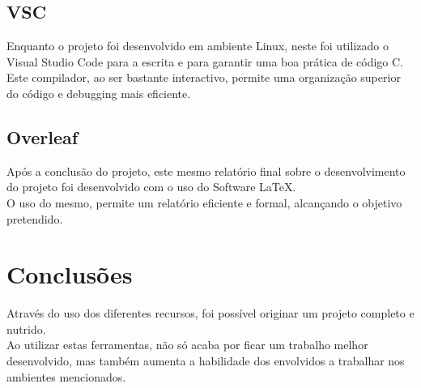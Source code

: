 \subsection{VSC}
\label{chap3:rec:vsc}
Enquanto o projeto foi desenvolvido em ambiente Linux, neste foi utilizado o Visual Studio Code para a escrita e para garantir uma boa prática de código C. Este compilador, ao ser bastante interactivo, permite uma organização superior do código e debugging mais eficiente.

\subsection{Overleaf}
\label{chap3:rec:overleaf}
Após a conclusão do projeto, este mesmo relatório final sobre o desenvolvimento do projeto foi desenvolvido com o uso do Software \LaTeX. \\
O uso do mesmo, permite um relatório eficiente e formal, alcançando o objetivo pretendido.

\section{Conclusões}
\label{chap3:sec:concs}
Através do uso dos diferentes recursos, foi possível originar um projeto completo e nutrido. \\
Ao utilizar estas ferramentas, não só acaba por ficar um trabalho melhor desenvolvido, mas também aumenta a habilidade dos envolvidos a trabalhar nos ambientes mencionados. 